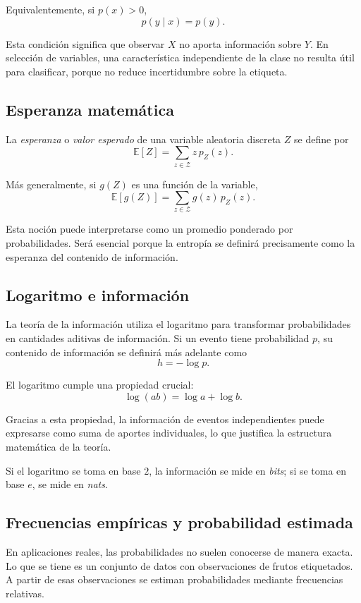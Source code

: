 \documentclass{article}
\begin{document}
Equivalentemente, si \(p(x)>0\),
\[
p(y\mid x)=p(y).
\]

Esta condición significa que observar \(X\) no aporta información sobre \(Y\). En selección de variables, una característica independiente de la clase no resulta útil para clasificar, porque no reduce incertidumbre sobre la etiqueta.

\subsection{Esperanza matemática}

La \textit{esperanza} o \textit{valor esperado} de una variable aleatoria discreta \(Z\) se define por
\[
\mathbb{E}[Z]=\sum_{z\in\mathcal{Z}} z\,p_Z(z).
\]

Más generalmente, si \(g(Z)\) es una función de la variable,
\[
\mathbb{E}[g(Z)] = \sum_{z\in\mathcal{Z}} g(z)\,p_Z(z).
\]

Esta noción puede interpretarse como un promedio ponderado por probabilidades. Será esencial porque la entropía se definirá precisamente como la esperanza del contenido de información.

\subsection{Logaritmo e información}

La teoría de la información utiliza el logaritmo para transformar probabilidades en cantidades aditivas de información. Si un evento tiene probabilidad \(p\), su contenido de información se definirá más adelante como
\[
h=-\log p.
\]

El logaritmo cumple una propiedad crucial:
\[
\log(ab)=\log a+\log b.
\]

Gracias a esta propiedad, la información de eventos independientes puede expresarse como suma de aportes individuales, lo que justifica la estructura matemática de la teoría.

Si el logaritmo se toma en base \(2\), la información se mide en \textit{bits}; si se toma en base \(e\), se mide en \textit{nats}.

\subsection{Frecuencias empíricas y probabilidad estimada}

En aplicaciones reales, las probabilidades no suelen conocerse de manera exacta. Lo que se tiene es un conjunto de datos con observaciones de frutos etiquetados. A partir de esas observaciones se estiman probabilidades mediante frecuencias relativas.
\end{document}
